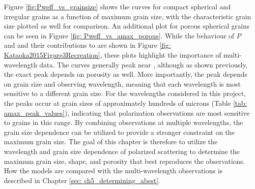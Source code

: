 




Figure \ref{fig:Pweff_vs_grainsize} shows the \Pweff curves for compact spherical and irregular grains as a function of maximum grain size, with the characteristic grain size plotted as well for comparison. An additional plot for porous spherical grains can be seen in Figure \ref{fig: Pweff_vs_amax_porous}. While the behaviour of $P$ and \weff and their contributions to \Pweff are shown in Figure \ref{fig: Kataoka2015Figure3Recreation}, these plots highlight the importance of multi-wavelength data. The \Pweff curves generally peak near \acharNS, although as shown previously, the exact peak depends on porosity as well. More importantly, the peak \Pweff depends on grain size and observing wavelength, meaning that each wavelength is most sensitive to a different grain size. For the wavelengths considered in this project, the peaks occur at grain sizes of approximately hundreds of microns (Table \ref{tab: amax_peak_values}), indicating that polarization observations are most sensitive to grains in this range. By combining observations at multiple wavelengths, the grain size dependence can be utilized to provide a stronger constraint on the maximum grain size. The goal of this chapter is therefore to utilize the wavelength and grain size dependence of polarized scattering to determine the maximum grain size, shape, and porosity that best reproduces the observations. How the models are compared with the multi-wavelength observations is described in Chapter \ref{sec: ch5_determining_abest}.











